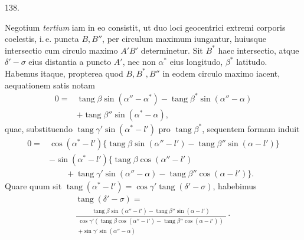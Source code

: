 \par{}\medskip
\begin{center}\hypertarget{native-185-article138}{}138.\end{center}
Negotium \emph{tertium} iam in eo consistit, ut duo loci geocentrici extremi corporis
coelestis, i.\,e. puncta $B,B''$, per circulum maximum iungantur, huiusque
intersectio cum circulo maximo $A'B'$ determinetur. Sit $B^*$ haec intersectio,
atque $\delta'-\sigma$ eius distantia a puncto $A'$, nec non $\alpha^*$ eius longitudo, $\beta^*$
latitudo. Habemus itaque, propterea quod $B,B^*,B''$ in eodem circulo maximo
iacent, aequationem satis notam
\[
\begin{aligned}
0={}&\operatorname{tang}\beta\sin(\alpha''-\alpha^*)-\operatorname{tang}\beta^*\sin(\alpha''-\alpha)\\
&+\operatorname{tang}\beta''\sin(\alpha^*-\alpha),
\end{aligned}
\]
quae, substituendo $\operatorname{tang}\gamma'\sin(\alpha^*-l')$ pro $\operatorname{tang}\beta^*$, sequentem formam induit
\[
\begin{aligned}
0={}&\cos(\alpha^*-l')\{\operatorname{tang}\beta\sin(\alpha''-l')-\operatorname{tang}\beta''\sin(\alpha-l')\}\\
&-\sin(\alpha^*-l')\{\operatorname{tang}\beta\cos(\alpha''-l')\\
&\qquad+\operatorname{tang}\gamma'\sin(\alpha''-\alpha)-\operatorname{tang}\beta''\cos(\alpha-l')\}.
\end{aligned}
\]
Quare quum sit $\operatorname{tang}(\alpha^*-l')=\cos\gamma'\operatorname{tang}(\delta'-\sigma)$, habebimus
\[
\begin{gathered}
\operatorname{tang}(\delta'-\sigma)=\\[.4ex]
\frac{\operatorname{tang}\beta\sin(\alpha''-l')-\operatorname{tang}\beta''\sin(\alpha-l')}{\begin{gathered}\cos\gamma'(\operatorname{tang}\beta\cos(\alpha''-l')-\operatorname{tang}\beta''\cos(\alpha-l'))\\+\sin\gamma'\sin(\alpha''-\alpha)\end{gathered}}\mathpunct{\cdot}
\end{gathered}
\]


